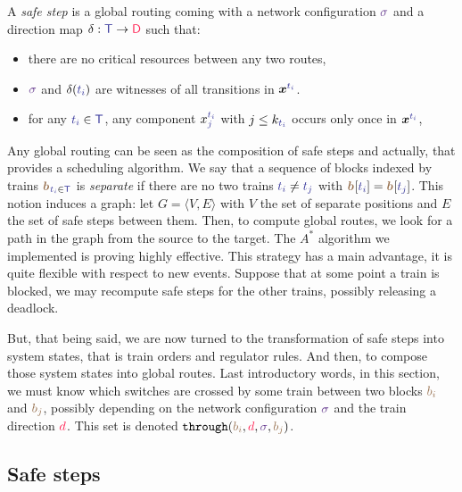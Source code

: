 \documentclass[runningheads]{llncs}
\newcommand{\directions}{\dirFmt{\mathsf{D}}}
\newcommand{\throughS}{{\mathtt{through}}}
\newcommand{\dirFmt}[1]{{\color{dircolor} #1}}
\newcommand{\posFmt}[1]{{\color{poscolor}{#1}}}
\newcommand{\bid}[1]{\ensuremath{\posFmt{b_{#1}}}}
\newcommand{\swFmt}[1]{{\color{swcolor}{#1}}}
\newcommand{\switches}{\ensuremath{\swFmt{\sigma}}}
\newcommand{\trainFmt}[1]{{\color{traincolor} #1}}
\newcommand{\trains}{{\trainFmt{\mathsf{T}}}}
\newcommand{\tid}[1]{\ensuremath{\trainFmt{t_{#1}}}}
\begin{document}
A \emph{safe step} is a global routing  coming with a network configuration $\switches$ and a direction map $\delta: \trains \to \directions$ such that:
\begin{itemize}
\item there are no critical resources between any two routes,
\item $\switches$ and $\delta(\tid{i})$ are witnesses of all transitions in $\vec{x}^\tid{i}$. 
\item for any $\tid{i} \in \trains$, any component $x_j^\tid{i}$ with $j \leq k_{\tid{i}}$ occurs only once in $\vec{x}^{\tid{i}}$,
\end{itemize}

Any global routing can be seen as the composition of safe steps and actually, that provides a scheduling algorithm. We say that a sequence of blocks indexed by trains $\vec{\bid{}}_{\tid{i} \in \trains}$ is \emph{separate} if there are no two trains $\tid{i} \neq \tid{j}$ with $\vec{\bid{}}[\tid{i}] = \vec{\bid{}}[\tid{j}]$. This notion induces a graph: let $G = \langle V, E\rangle$ with $V$ the set of separate positions and $E$ the set of safe steps between them.  Then, to compute global routes, we look for a path in the graph from the source to the target. The  $A^*$ algorithm we implemented is proving highly effective. This strategy has a main advantage, it is quite flexible with respect to new events. Suppose that at some point a train is blocked, we may recompute safe steps for the other trains, possibly releasing a deadlock. 

But, that being said, we are now turned to the transformation of safe steps into system states, that is train orders and regulator rules. And then, to compose those system states into global routes. Last introductory words, in this section, we must know which switches are crossed by some train between two blocks $\bid{i}$ and $\bid{j}$, possibly depending on the network configuration $\switches$ and the train direction $\dirFmt{d}$. This set is denoted $\throughS(\bid{i}, \dirFmt{d}, \switches, \bid{j})$. 

\subsection{Safe steps}
\label{sec:experiments:4}
\end{document}
